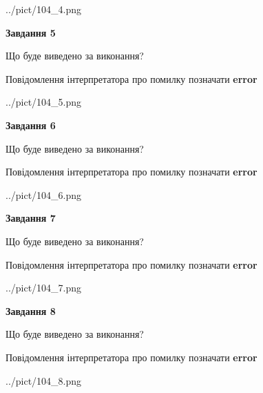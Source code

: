 \documentclass[12pt, ukrainian]{article}
\begin{document}
{\begin{center}
	{../pict/104_4.png}
\end{center}
\newpage

{\begin {center}\textbf{Завдання 5}\end {center}}\par
Що буде виведено за виконання? \par
Повідомлення інтерпретатора про помилку позначати \textbf{error}

\begin{center}
	{../pict/104_5.png}
\end{center}
\newpage

{\begin {center}\textbf{Завдання 6}\end {center}}\par
Що буде виведено за виконання? \par
Повідомлення інтерпретатора про помилку позначати \textbf{error}

\begin{center}
	{../pict/104_6.png}
\end{center}
\newpage

{\begin {center}\textbf{Завдання 7}\end {center}}\par
Що буде виведено за виконання? \par
Повідомлення інтерпретатора про помилку позначати \textbf{error}

\begin{center}
	{../pict/104_7.png}
\end{center}
\newpage

{\begin {center}\textbf{Завдання 8}\end {center}}\par
Що буде виведено за виконання? \par
Повідомлення інтерпретатора про помилку позначати \textbf{error}

\begin{center}
	{../pict/104_8.png}
\end{center}
\newpage

}
\end{document}
